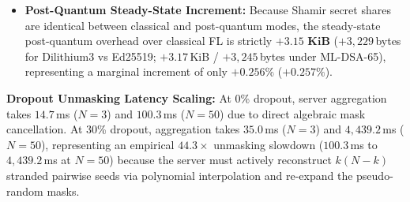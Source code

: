 \documentclass[11pt,a4paper]{report}
\begin{document}
\begin{itemize}[itemsep=2pt]
  \item \textbf{Post-Quantum Steady-State Increment:} Because Shamir secret shares are identical between classical and post-quantum modes, the steady-state post-quantum overhead over classical FL is strictly $\mathbf{+3.15\text{ KiB}}$ ($+3{,}229$\,bytes for Dilithium3 vs Ed25519; $+3.17$\,KiB / $+3{,}245$\,bytes under ML-DSA-65), representing a marginal increment of only $\mathbf{+0.256\%}$ ($+0.257\%$).
\end{itemize}

\noindent\textbf{Dropout Unmasking Latency Scaling:} At 0\% dropout, server aggregation takes $14.7$\,ms ($N=3$) and $100.3$\,ms ($N=50$) due to direct algebraic mask cancellation. At 30\% dropout, aggregation takes $35.0$\,ms ($N=3$) and $4{,}439.2$\,ms ($N=50$), representing an empirical $\mathbf{44.3\times}$ unmasking slowdown ($100.3$\,ms to $4{,}439.2$\,ms at $N=50$) because the server must actively reconstruct $k(N-k)$ stranded pairwise seeds via polynomial interpolation and re-expand the pseudo-random masks.
\end{document}
